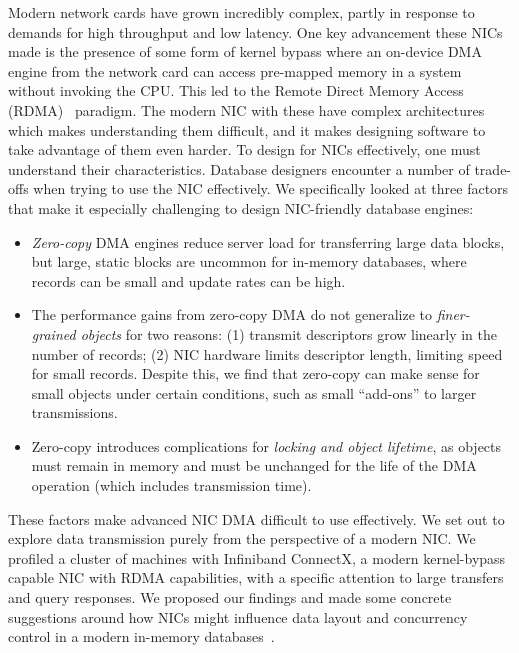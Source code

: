Modern network cards have grown incredibly complex, partly in response to
demands for high throughput and low latency. One key advancement these NICs made 
is the presence of some form of kernel bypass where an on-device DMA engine from the network card 
can access pre-mapped memory in a system without invoking the CPU. This led to the Remote 
Direct Memory Access (RDMA)~\cite{rdmapatent} paradigm. The modern NIC with these  have complex architectures
which makes understanding them difficult, and it makes designing software to take advantage
of them even harder. To design for NICs effectively, one must understand their characteristics.
Database designers encounter a number of trade-offs when trying to use the NIC effectively. We specifically 
looked at three factors that make it especially challenging to design NIC-friendly
database engines:
\begin{itemize}
  \item {\em Zero-copy} DMA engines reduce server load for transferring large data
    blocks, but large, static blocks are uncommon for in-memory databases,
    where records can be small and update rates can be high.
  \item The performance gains from zero-copy DMA do not generalize to
      {\em finer-grained objects} for two reasons: (1) transmit
      descriptors grow linearly in the number of records;
      (2) NIC hardware limits descriptor
      length, limiting speed for small records.
      Despite this, we find that zero-copy
      can make sense for small objects under certain conditions, such as
      small ``add-ons'' to larger transmissions.
   \item Zero-copy introduces complications for \emph{locking and object
      lifetime}, as objects must remain in memory and must be
      unchanged for the life of the DMA operation (which includes transmission
      time).
\end{itemize}


These factors make advanced NIC DMA difficult to use effectively. We set out to explore data 
transmission purely from the perspective of a modern NIC. We profiled a cluster of machines with
Infiniband ConnectX, a modern kernel-bypass capable NIC
with RDMA capabilities, with a specific attention to large transfers and query responses.
We proposed our findings and made some concrete suggestions around how NICs might
influence data layout and concurrency control in a modern in-memory 
databases~\cite{KesavanRicciStutsman:IMDM16}. 

